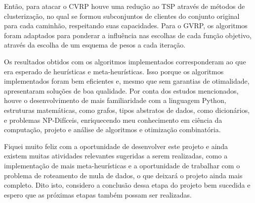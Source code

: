 \documentclass[12pt, a4paper]{article}
\begin{document}
Então, para atacar o CVRP houve uma redução ao TSP através de métodos de clusterização, no qual se formou subconjuntos de clientes do conjunto original para cada caminhão, respeitando suas capacidades. 
Para o GVRP, os algoritmos foram adaptados para ponderar a influência nas escolhas de cada função objetivo, através da escolha de um esquema de pesos a cada iteração.

Os resultados obtidos com os algoritmos implementados corresponderam ao que era esperado de heurísticas e meta-heurísticas. Isso porque os algoritmos implementados foram bem eficientes e, mesmo que sem garantias de otimalidade, apresentaram soluções de boa qualidade. Por conta dos estudos mencionados, houve o desenvolvimento de mais familiaridade com a linguagem Python, estruturas matemáticas, como grafos, tipos abstratos de dados, como dicionários, e problemas NP-Difíceis, enriquecendo meu conhecimento em ciência da computação, projeto e análise de algoritmos e otimização combinatória.

Fiquei muito feliz com a oportunidade de desenvolver este projeto e ainda existem muitas atividades relevantes sugeridas a serem realizadas, como a implementação de mais meta-heurísticas e a oportunidade de trabalhar com o problema de roteamento de mula de dados, o que deixará o projeto ainda mais completo. Dito isto, considero a conclusão dessa etapa do projeto bem sucedida e espero que as próximas etapas também possam ser realizadas.



\end{document}
